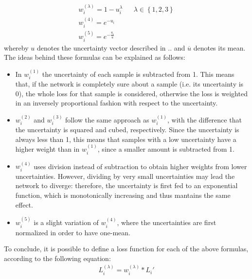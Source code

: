 \documentclass[11pt,twoside,a4paper]{article}
\begin{document}
\begin{equation*}
\begin{aligned}
w_{i}^{(\lambda )} = 1-u_{i}^{\lambda} && \textstyle \lambda \in \left \{ 1, 2, 3 \right \} \\
w_{i}^{(4)} = e^{-u_{i}} \\
w_{i}^{(5)} = e^{-\frac{u_{i}}{\overline{u}}}
\end{aligned}
\end{equation*}
whereby \({u}\) denotes the uncertainty vector described in .. and \(\overline{u}\) denotes its mean.\newline
The ideas behind these formulas can be explained as follows:
\begin{itemize}
\item In \(w_{i}^{(1)}\) the uncertainty of each sample is subtracted from 1. This means that, if the network is completely sure about a sample (i.e. its uncertainty is 0), the whole loss for that sample is considered, otherwise the loss is weighted in an inversely proportional fashion with respect to the uncertainty.
\item \(w_{i}^{(2)}\) and \(w_{i}^{(3)}\) follow the same approach as \(w_{i}^{(1)}\), with the difference that the uncertainty is squared and cubed, respectively. Since the uncertainty is always less than 1, this means that samples with a low uncertainty have a higher weight than in \(w_{i}^{(1)}\), since a smaller amount is subtracted from 1.
\item \(w_{i}^{(4)}\) uses division instead of subtraction to obtain higher weights from lower uncertainties. However, dividing by very small uncertainties may lead the network to diverge: therefore, the uncertainty is first fed to an exponential function, which is monotonically increasing and thus mantains the same effect.
\item \(w_{i}^{(5)}\) is a slight variation of \(w_{i}^{(4)}\), where the uncertainties are first normalized in order to have one-mean.
\end{itemize}

To conclude, it is possible to define a loss function for each of the above formulas, according to the following equation:
\begin{align}
L_{i}^{(\lambda)} = w_{i}^{(\lambda)} * {L_{i}}'
\end{align}
\end{document}
